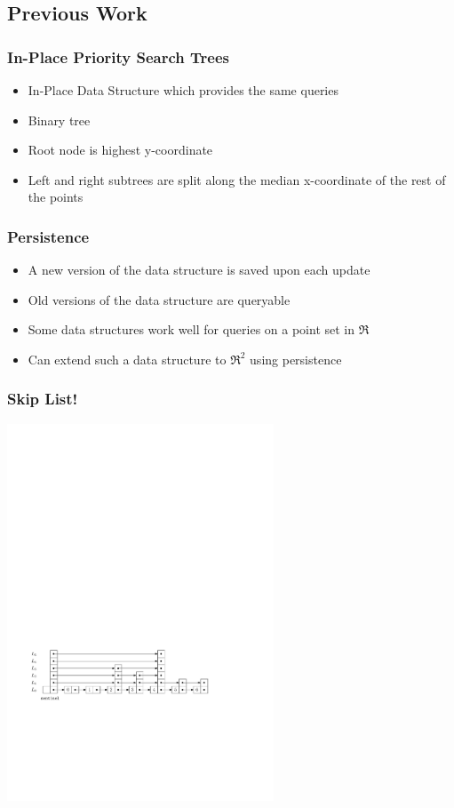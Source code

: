 \documentclass{beamer}
\begin{document}
\subsection{Previous Work}

\begin{frame}
  \frametitle{In-Place Priority Search Trees}

  \begin{itemize}
  \item
    In-Place Data Structure which provides the same queries
  \item
    Binary tree
  \item
    Root node is highest y-coordinate
  \item
    Left and right subtrees are split along the median x-coordinate of
    the rest of the points
  \end{itemize}

\end{frame}

\begin{frame}
  \frametitle{Persistence}

  \begin{itemize}
  \item
    A new version of the data structure is saved upon each update
  \item
    Old versions of the data structure are queryable
  \item
    Some data structures work well for queries on a point set in $\Re$
  \item
    Can extend such a data structure to $\Re^2$ using persistence
  \end{itemize}

\end{frame}

\begin{frame}
  \frametitle{Skip List!}

  \begin{center}
    \includegraphics[width=300px]{figs/skiplist.pdf}
  \end{center}

\end{frame}
\end{document}

